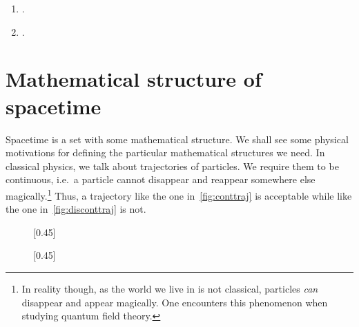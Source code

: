 \documentclass[a4paper, 11pt]{book}
\theoremstyle{definition}
\begin{document}
    \begin{enumerate}
        \item {}.
        \item {}.
    \end{enumerate}

    \section{Mathematical structure of spacetime}

    Spacetime is a set with some mathematical structure. We shall see some physical motivations for defining the particular mathematical structures we need. In classical physics, we talk about trajectories of particles. We require them to be continuous, i.e.\ a particle cannot disappear and reappear somewhere else magically.\footnote{In reality though, as the world we live in is not classical, particles \textit{can} disappear and appear magically. One encounters this phenomenon when studying quantum field theory.} Thus, a trajectory like the one in~\cref{fig:conttraj} is acceptable while like the one in~\cref{fig:disconttraj} is not.

    \begin{figure}[htb]
        \centering
        [0.45\textwidth]
        {
        }
        \hfill
        [0.45\textwidth]
        {
        }
        \label{fig:traj}
    \end{figure}
\end{document}
